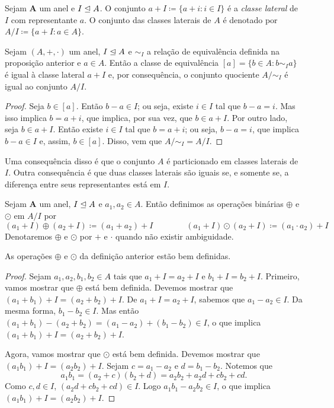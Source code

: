 \begin{defi}
	Sejam $\bm A$ um anel e $I \mathrel{\unlhd} A$. O conjunto $a+I \coloneqq \{a+i : i \in I\}$ é a \emph{classe lateral} de $I$ com representante $a$. O conjunto das classes laterais de $A$ é denotado por $A/I \coloneqq \{a+I : a \in A\}$.
\end{defi}

\begin{prop}
	Sejam $(A,+,\cdot)$ um anel, $I \mathrel{\unlhd} A$ e $\sim_I$ a relação de equivalência definida na proposição anterior e $a \in A$. Então a classe de equivalência $[a]=\{b \in A : b \sim_I a\}$ é igual à classe lateral $a+I$ e, por consequência, o conjunto quociente $A/\sim_I$ é igual ao conjunto $A/I$.
\end{prop}
\begin{proof}
	Seja $b \in [a]$. Então $b-a \in I$; ou seja, existe $i \in I$ tal que $b-a=i$. Mas isso implica $b=a+i$, que implica, por sua vez, que $b \in a+I$. Por outro lado, seja $b \in a+I$. Então existe $i \in I$ tal que $b=a+i$; ou seja, $b-a=i$, que implica $b-a \in I$ e, assim, $b \in [a]$. Disso, vem que $A/\sim_I = A/I$.
\end{proof}

	Uma consequência disso é que o conjunto $A$ é particionado em classes laterais de $I$. Outra consequência é que duas classes laterais são iguais se, e somente se, a diferença entre seus representantes está em $I$.

\begin{defi}
	Sejam $\bm A$ um anel, $I \mathrel{\unlhd} A$ e $a_1,a_2 \in A$. Então definimos as operações binárias $\oplus$ e $\odot$ em $A/I$ por
	\begin{equation*}
	(a_1+I) \oplus (a_2+I) \coloneqq (a_1+a_2)+I \qquad \qquad (a_1+I) \odot (a_2+I) \coloneqq (a_1 \cdot a_2)+I
	\end{equation*}
Denotaremos $\oplus$ e $\odot$ por $+$ e $\cdot$ quando não existir ambiguidade.
\end{defi}

\begin{prop}
	As operações $\oplus$ e $\odot$ da definição anterior estão bem definidas.
\end{prop}
\begin{proof}
	Sejam $a_1,a_2,b_1,b_2 \in A$ tais que $a_1+I=a_2+I$ e $b_1+I=b_2+I$. Primeiro, vamos mostrar que $\oplus$ está bem definida. Devemos mostrar que $(a_1+b_1)+I=(a_2+b_2)+I$. De $a_1+I=a_2+I$, sabemos que $a_1-a_2 \in I$. Da mesma forma, $b_1-b_2 \in I$. Mas então $(a_1+b_1)-(a_2+b_2) = (a_1-a_2)+(b_1-b_2) \in I$, o que implica $(a_1+b_1)+I=(a_2+b_2)+I$.

	Agora, vamos mostrar que $\odot$ está bem definida. Devemos mostrar que $(a_1b_1)+I=(a_2b_2)+I$. Sejam $c=a_1-a_2$ e $d=b_1-b_2$. Notemos que
	\begin{equation*}
	a_1b_1 = (a_2+c)(b_2+d) = a_2b_2 + a_2d + cb_2 + cd.
	\end{equation*}
Como $c,d \in I$, $(a_2d + cb_2 + cd) \in I$. Logo $a_1b_1-a_2b_2 \in I$, o que implica $(a_1b_1)+I=(a_2b_2)+I$.
\end{proof}

